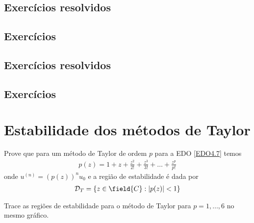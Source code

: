 \subsection*{Exercícios resolvidos}

\emconstrucao

\subsection*{Exercícios}

\emconstrucao






\subsection*{Exercícios resolvidos}

\emconstrucao

\subsection*{Exercícios}

\emconstrucao

\section{Estabilidade dos métodos de Taylor}
\begin{ex}
Prove que para um método de Taylor de ordem $p$ para a EDO \eqref{EDO4.7} temos
\begin{eqnarray}
  p(z)= 1 + z+ \frac{z^2}{2!} +\frac{z^3}{3!}+\ldots +\frac{z^p}{p!}
\end{eqnarray}
onde  $u^{(n)} = (p(z))^nu_0$ e a região de estabilidade é dada por
\begin{eqnarray}
 \mathcal D_{T} = \{z \in  \field{C}:  \left|p(z)\right|<1\}
\end{eqnarray}

Trace as regiões de estabilidade para o método de Taylor para $p=1,\ldots ,6$ no mesmo gráfico.
\end{ex}



